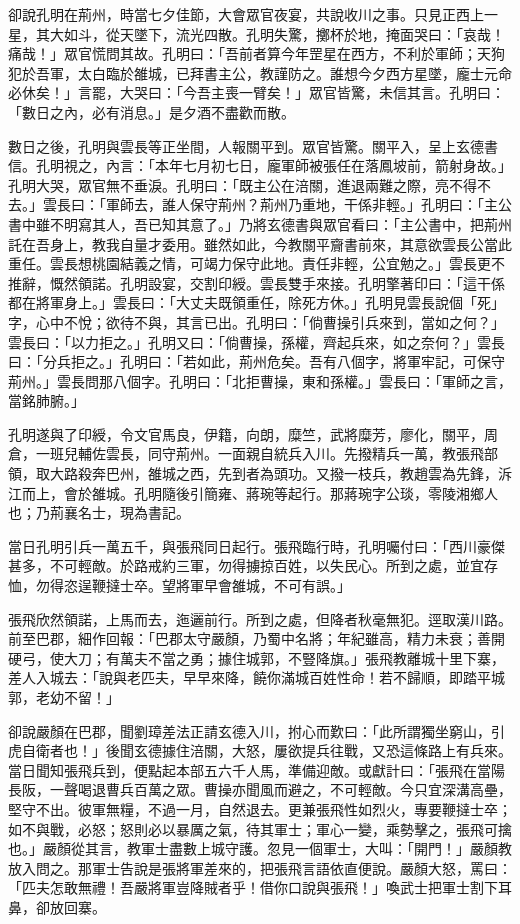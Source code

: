 卻說孔明在荊州，時當七夕佳節，大會眾官夜宴，共說收川之事。只見正西上一星，其大如斗，從天墜下，流光四散。孔明失驚，擲杯於地，掩面哭曰：「哀哉！痛哉！」眾官慌問其故。孔明曰：「吾前者算今年罡星在西方，不利於軍師；天狗犯於吾軍，太白臨於雒城，已拜書主公，教謹防之。誰想今夕西方星墜，龐士元命必休矣！」言罷，大哭曰：「今吾主喪一臂矣！」眾官皆驚，未信其言。孔明曰：「數日之內，必有消息。」是夕酒不盡歡而散。

數日之後，孔明與雲長等正坐間，人報關平到。眾官皆驚。關平入，呈上玄德書信。孔明視之，內言：「本年七月初七日，龐軍師被張任在落鳳坡前，箭射身故。」孔明大哭，眾官無不垂淚。孔明曰：「既主公在涪關，進退兩難之際，亮不得不去。」雲長曰：「軍師去，誰人保守荊州？荊州乃重地，干係非輕。」孔明曰：「主公書中雖不明寫其人，吾已知其意了。」乃將玄德書與眾官看曰：「主公書中，把荊州託在吾身上，教我自量才委用。雖然如此，今教關平齎書前來，其意欲雲長公當此重任。雲長想桃園結義之情，可竭力保守此地。責任非輕，公宜勉之。」雲長更不推辭，慨然領諾。孔明設宴，交割印綬。雲長雙手來接。孔明擎著印曰：「這干係都在將軍身上。」雲長曰：「大丈夫既領重任，除死方休。」孔明見雲長說個「死」字，心中不悅；欲待不與，其言已出。孔明曰：「倘曹操引兵來到，當如之何？」雲長曰：「以力拒之。」孔明又曰：「倘曹操，孫權，齊起兵來，如之奈何？」雲長曰：「分兵拒之。」孔明曰：「若如此，荊州危矣。吾有八個字，將軍牢記，可保守荊州。」雲長問那八個字。孔明曰：「北拒曹操，東和孫權。」雲長曰：「軍師之言，當銘肺腑。」

孔明遂與了印綬，令文官馬良，伊籍，向朗，糜竺，武將糜芳，廖化，關平，周倉，一班兒輔佐雲長，同守荊州。一面親自統兵入川。先撥精兵一萬，教張飛部領，取大路殺奔巴州，雒城之西，先到者為頭功。又撥一枝兵，教趙雲為先鋒，泝江而上，會於雒城。孔明隨後引簡雍、蔣琬等起行。那蔣琬字公琰，零陵湘鄉人也；乃荊襄名士，現為書記。

當日孔明引兵一萬五千，與張飛同日起行。張飛臨行時，孔明囑付曰：「西川豪傑甚多，不可輕敵。於路戒約三軍，勿得擄掠百姓，以失民心。所到之處，並宜存恤，勿得恣逞鞭撻士卒。望將軍早會雒城，不可有誤。」

張飛欣然領諾，上馬而去，迤邐前行。所到之處，但降者秋毫無犯。逕取漢川路。前至巴郡，細作回報：「巴郡太守嚴顏，乃蜀中名將；年紀雖高，精力未衰；善開硬弓，使大刀；有萬夫不當之勇；據住城郭，不豎降旗。」張飛教離城十里下寨，差人入城去：「說與老匹夫，早早來降，饒你滿城百姓性命！若不歸順，即踏平城郭，老幼不留！」

卻說嚴顏在巴郡，聞劉璋差法正請玄德入川，拊心而歎曰：「此所謂獨坐窮山，引虎自衛者也！」後聞玄德據住涪關，大怒，屢欲提兵往戰，又恐這條路上有兵來。當日聞知張飛兵到，便點起本部五六千人馬，準備迎敵。或獻計曰：「張飛在當陽長阪，一聲喝退曹兵百萬之眾。曹操亦聞風而避之，不可輕敵。今只宜深溝高壘，堅守不出。彼軍無糧，不過一月，自然退去。更兼張飛性如烈火，專要鞭撻士卒；如不與戰，必怒；怒則必以暴厲之氣，待其軍士；軍心一變，乘勢擊之，張飛可擒也。」嚴顏從其言，教軍士盡數上城守護。忽見一個軍士，大叫：「開門！」嚴顏教放入問之。那軍士告說是張將軍差來的，把張飛言語依直便說。嚴顏大怒，罵曰：「匹夫怎敢無禮！吾嚴將軍豈降賊者乎！借你口說與張飛！」喚武士把軍士割下耳鼻，卻放回寨。

